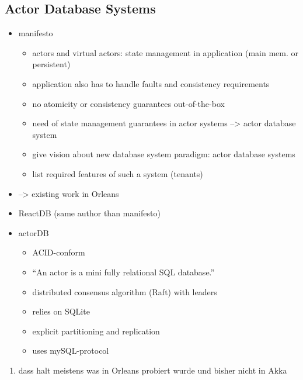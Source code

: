   


  \subsection{Actor Database Systems}
  \begin{itemize}
    \item manifesto~\cite{manifesto}
      \begin{itemize}
        \item actors and virtual actors: state management in application (main mem. or persistent)
        \item application also has to handle faults and consistency requirements
        \item no atomicity or consistency guarantees out-of-the-box
        \item need of state management guarantees in actor systems --> actor database system
        \item give vision about new database system paradigm: actor database systems
        \item list required features of such a system (tenants)
      \end{itemize}
    \item --> existing work in Orleans
    \item ReactDB (same author than manifesto)~\cite{Shah:reactdb}
    \item actorDB~\cite{biokoda:actordb}
      \begin{itemize}
        \item ACID-conform
        \item \enquote{An actor is a mini fully relational SQL database.}~\cite{biokoda:actordb}
        \item distributed consensus algorithm (Raft) with leaders
        \item relies on SQLite
        \item explicit partitioning and replication
        \item uses mySQL-protocol
      \end{itemize}
  \end{itemize}

\begin{enumerate}
  \item dass halt meistens was in Orleans probiert wurde und bisher nicht in Akka
\end{enumerate}